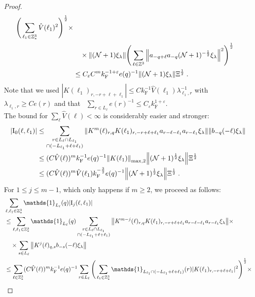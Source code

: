 \documentclass[12pt,a4paper]{article}
\numberwithin{equation}{section}
\newcommand{\1}{\mathbb{I}}
\newcommand{\F}{\mathrm{F}}
\newcommand{\I}{\mathrm{I}}
\newcommand{\Z}{\mathbb{Z}}
\newcommand{\NN}{\mathcal{N}}
\newcommand{\half}{\frac{1}{2}}
\theoremstyle{plain}
\theoremstyle{definition}
\theoremstyle{remark}
\theoremstyle{plain}
\theoremstyle{definition}
\theoremstyle{remark}
\begin{document}
\begin{proof}
\begin{align}
		\Bigg( \sum_{\ell_1 \in \Z^3_*} \hat{V}(\ell_1)^2 \Bigg)^{\half} \times \nonumber\\
	&\quad \times \norm{(\NN+1) \xi_\lambda}
		\Bigg( \sum_{\ell \in \Z^3} \norm{a_{-q+\ell} a_{-q} (\NN+1)^{-\half} \xi_\lambda}^2 \Bigg)^{\half} \nonumber\\
	&\leq C_\varepsilon C^m k_{\F}^{-1 + \varepsilon} e(q)^{-1}
		\norm{ (\NN+1) \xi_\lambda } \Xi^{\half} \;. \label{eq:estEQ2151_Coulomb}
\end{align}
Note that we used $ |K(\ell_1)_{r,-r+\ell+\ell_1}| \le C k_{\F}^{-1} \hat{V}(\ell_1) \lambda_{\ell_1,r}^{-1} $ with $ \lambda_{\ell_1,r} \ge C e(r) $ and that~\cite[Lemma~3.2]{CHN24} $ \sum_{r \in L_\ell} e(r)^{-1} \le C_\varepsilon k_{\F}^{1+\varepsilon} $.\\
The bound for $ \sum_{\ell} \hat{V}(\ell) < \infty $ is considerably easier and stronger:
\begin{align}
	|\I_0(\ell, \ell_1)|
	&\leq \sum_{\substack{r\in L_{\ell} \cap L_{\ell_1} \\ \cap (-L_{\ell_1}+\ell+\ell_1)}} \norm{K^m(\ell)_{r,q} K(\ell_1)_{r,-r+\ell+\ell_1} a_{r-\ell-\ell_1} a_{r-\ell_1} \xi_\lambda}\norm{ b_{-q}(-\ell) \xi_\lambda}\nonumber\\
	&\leq (C \hat{V}(\ell))^m k_{\F}^{-1} e(q)^{-1}
		\norm{K(\ell_1)}_{\max,2} \norm{ (\NN+1)^\half \xi_\lambda } \Xi^{\half} \nonumber\\
	&\leq (C \hat{V}(\ell))^m
		\hat{V}(\ell_1)
		k_{\F}^{-\frac 32} e(q)^{-1}
		\norm{ (\NN+1)^\half \xi_\lambda } \Xi^{\half} \;. \label{eq:estEQ2151}
\end{align}
For $ 1 \le j \le m-1 $, which only happens if $ m \ge 2 $, we proceed as follows:
\begin{align}
	&\sum_{\ell,\ell_1 \in \Z^3_*} \mathds{1}_{L_\ell}(q) |\I_j(\ell, \ell_1)| \nonumber\\
	&\leq \sum_{\ell,\ell_1 \in \Z^3_*} \mathds{1}_{L_\ell}(q) \sum\limits_{\substack{r\in L_{\ell} \cap L_{\ell_1}\\ \cap (-L_{\ell_1}+\ell+\ell_1)}}
		\norm{ K^{m-j}(\ell)_{r,q} K(\ell_1)_{r,-r+\ell+\ell_1} a_{r-\ell-\ell_1} a_{r-\ell_1} \xi_\lambda} \times \nonumber\\
	&\quad \times \sum\limits_{s \in L_{\ell}}
		\norm{ K^j(\ell)_{q,s} b_{-s}(-\ell) \xi_\lambda }\nonumber\\
	&\leq \sum_{\ell \in \Z^3_*} (C \hat{V}(\ell))^m k_{\F}^{-1} e(q)^{-1}
		\sum_{r \in L_\ell}
		\Bigg( \sum_{\ell_1 \in \Z^3_*} \mathds{1}_{L_{\ell_1} \cap (-L_{\ell_1}+\ell+\ell_1) }(r) |K(\ell_1)_{r,-r+\ell+\ell_1}|^2 \Bigg)^{\half} \times \nonumber\\

\end{align}
\end{proof}
\end{document}
